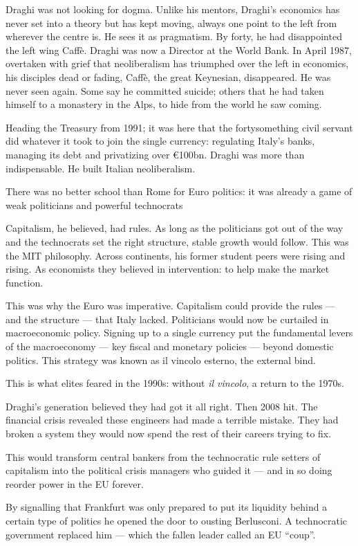 \documentclass[
]{book}
\begin{document}
Draghi was not looking for dogma. Unlike his mentors, Draghi's economics has never set into a theory but has kept moving, always one point to the left from wherever the centre is. He sees it as pragmatism. By forty, he had disappointed the left wing Caffè. Draghi was now a Director at the World Bank. In April 1987, overtaken with grief that neoliberalism has triumphed over the left in economics, his disciples dead or fading, Caffè, the great Keynesian, disappeared. He was never seen again. Some say he committed suicide; others that he had taken himself to a monastery in the Alps, to hide from the world he saw coming.

Heading the Treasury from 1991; it was here that the fortysomething civil servant did whatever it took to join the single currency: regulating Italy's banks, managing its debt and privatizing over €100bn. Draghi was more than indispensable. He built Italian neoliberalism.

There was no better school than Rome for Euro politics: it was already a game of weak politicians and powerful technocrats

Capitalism, he believed, had rules. As long as the politicians got out of the way and the technocrats set the right structure, stable growth would follow.
This was the MIT philosophy. Across continents, his former student peers were rising and rising. As economists they believed in intervention: to help make the market function.

This was why the Euro was imperative. Capitalism could provide the rules --- and the structure --- that Italy lacked. Politicians would now be curtailed in macroeconomic policy. Signing up to a single currency put the fundamental levers of the macroeconomy --- key fiscal and monetary policies --- beyond domestic politics. This strategy was known as il vincolo esterno, the external bind.

This is what elites feared in the 1990s: without \emph{il vincolo}, a return to the 1970s.

Draghi's generation believed they had got it all right. Then 2008 hit. The financial crisis revealed these engineers had made a terrible mistake. They had broken a system they would now spend the rest of their careers trying to fix.

This would transform central bankers from the technocratic rule setters of capitalism into the political crisis managers who guided it --- and in so doing reorder power in the EU forever.

By signalling that Frankfurt was only prepared to put its liquidity behind a certain type of politics he opened the door to ousting Berlusconi. A technocratic government replaced him --- which the fallen leader called an EU ``coup''.
\end{document}
